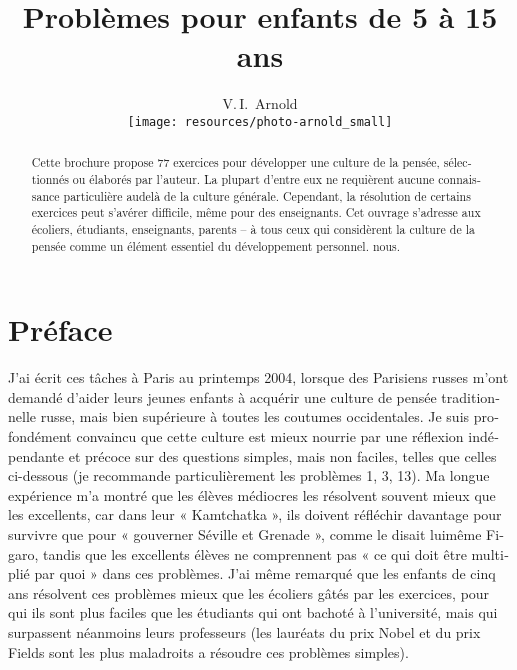 
\setdefaultlanguage{french}

\title{Problèmes pour enfants de 5 à 15 ans}

\author{V.\,I.~Arnold
\vspace*{2cm}\\
\texttt{[image: resources/photo-arnold\_small]}
}
\date{}


\maketitle
\thispagestyle{empty}
\cleardoublepage
\setcounter{page}{1}
\begin{abstract}
	Cette brochure propose 77 exercices pour développer une culture de la pensée,
	sélectionnés ou élaborés par l'auteur. La plupart d'entre eux ne requièrent aucune
	connaissance particulière au­delà de la culture générale. Cependant, la résolution
	de certains exercices peut s'avérer difficile, même pour des enseignants. Cet
	ouvrage s'adresse
	aux écoliers, étudiants, enseignants, parents – à tous ceux qui considèrent la
	culture de la pensée comme un élément essentiel du développement personnel.
	nous.
\end{abstract}
\clearpage

\section*{Préface}
J'ai écrit ces tâches à Paris au printemps 2004, lorsque des Parisiens russes m'ont demandé d'aider leurs jeunes enfants à acquérir une culture de pensée traditionnelle russe, mais bien supérieure à toutes les coutumes occidentales. Je suis profondément convaincu que cette culture est mieux nourrie par une réflexion indépendante et précoce sur des questions simples, mais non faciles, telles que celles ci-dessous (je recommande particulièrement les problèmes 1, 3, 13). Ma longue expérience m'a montré que les élèves médiocres les résolvent souvent mieux que les excellents, car dans leur « Kamtchatka », ils doivent réfléchir davantage pour survivre que pour « gouverner Séville et Grenade », comme le disait lui­même Figaro, tandis que les excellents élèves ne comprennent pas « ce qui doit être multiplié par quoi » dans ces problèmes. J'ai même remarqué que les enfants de cinq ans résolvent ces problèmes mieux que les écoliers gâtés par les exercices, pour qui ils sont plus faciles que les étudiants qui ont bachoté à l'université, mais qui surpassent néanmoins leurs professeurs (les lauréats du prix Nobel et du prix Fields sont les plus maladroits a résoudre ces problèmes simples).


